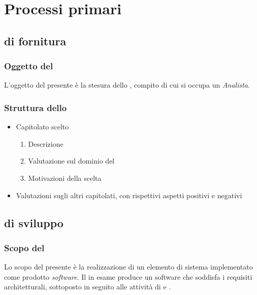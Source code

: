 \section{Processi primari}

	\subsection{ di fornitura}	
	\subsubsection{Oggetto del }
	L'oggetto del presente  è la stesura dello \StudioDiFattibilita, compito
	di cui si occupa un \textit{Analista}.
	\subsubsection{Struttura dello \StudioDiFattibilita}
		\begin{itemize}
			\item Capitolato scelto
				\begin{enumerate}
					\item Descrizione
					\item Valutazione sul dominio del 
					\item Motivazioni della scelta
				\end{enumerate}	
			\item Valutazioni sugli altri capitolati, con rispettivi aspetti positivi e negativi
		\end{itemize}


	\subsection{ di sviluppo}
        \subsubsection{Scopo del }
        Lo scopo del presente  \`e la realizzazione di un elemento di sistema implementato come prodotto
        \textit{software}. Il  in esame produce un software che soddisfa i requisiti architetturali, sottoposto
        in seguito alle attivit\`a di  e .
